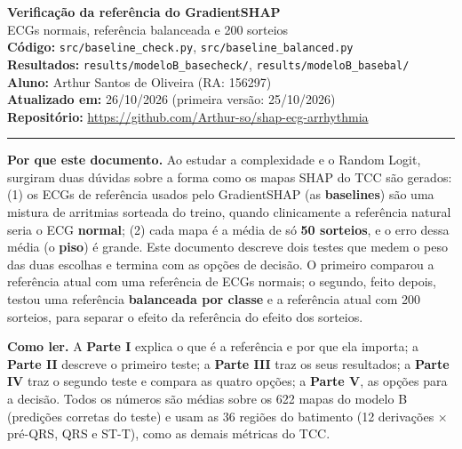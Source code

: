 \documentclass[11pt,a4paper]{article}
\begin{document}
\begin{center}
    {\LARGE \textbf{Verificação da referência do GradientSHAP}} \\[0.35em]
    {\large ECGs normais, referência balanceada e 200 sorteios} \\[0.3em]
    \textbf{Código:} \texttt{src/baseline\_check.py}, \texttt{src/baseline\_balanced.py} \\[0.2em]
    \textbf{Resultados:} \texttt{results/modeloB\_basecheck/}, \texttt{results/modeloB\_basebal/} \\[0.2em]
    \textbf{Aluno:} Arthur Santos de Oliveira (RA: 156297) \\[0.2em]
    \textbf{Atualizado em:} 26/10/2026 (primeira versão: 25/10/2026) \\[0.2em]
    \textbf{Repositório:} \url{https://github.com/Arthur-so/shap-ecg-arrhythmia}
\end{center}
\vspace{-0.5em}
\hrule
\vspace{0.8em}

\textbf{Por que este documento.} Ao estudar a complexidade e o Random Logit, surgiram duas dúvidas sobre a forma como os mapas SHAP do TCC são gerados: (1) os ECGs de referência usados pelo GradientSHAP (as \textbf{baselines}) são uma mistura de arritmias sorteada do treino, quando clinicamente a referência natural seria o ECG \textbf{normal}; (2) cada mapa é a média de só \textbf{50 sorteios}, e o erro dessa média (o \textbf{piso}) é grande. Este documento descreve dois testes que medem o peso das duas escolhas e termina com as opções de decisão. O primeiro comparou a referência atual com uma referência de ECGs normais; o segundo, feito depois, testou uma referência \textbf{balanceada por classe} e a referência atual com 200 sorteios, para separar o efeito da referência do efeito dos sorteios.

\textbf{Como ler.} A \textbf{Parte I} explica o que é a referência e por que ela importa; a \textbf{Parte II} descreve o primeiro teste; a \textbf{Parte III} traz os seus resultados; a \textbf{Parte IV} traz o segundo teste e compara as quatro opções; a \textbf{Parte V}, as opções para a decisão. Todos os números são médias sobre os 622 mapas do modelo B (predições corretas do teste) e usam as 36 regiões do batimento (12 derivações × pré-QRS, QRS e ST-T), como as demais métricas do TCC.
\end{document}
